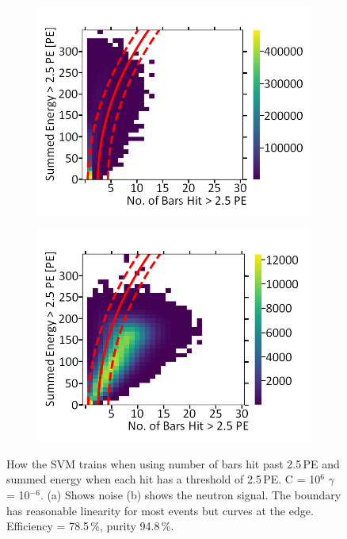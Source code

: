 \begin{figure}[!h]
\centering
\begin{subfigure}{.5\textwidth}
  \centering
  \includegraphics[width=\linewidth]{Appendix1/Figs/Bars1Sum1Noise.png}
  \captionsetup{width=.9\linewidth}
  \caption{}
  \label{subFig:Bars1Sum1N}
\end{subfigure}%
\begin{subfigure}{.5\textwidth}
  \centering
\includegraphics[width=\linewidth]{Appendix1/Figs/Bars1Sum1Signal.png}
  \captionsetup{width=.9\linewidth}
  \caption{}
  \label{subFig:Bars1Sum1S}
\end{subfigure}
\caption[LIBLINEAR SVM Nyström approximated RBF kernel for number of bars hit > 2.5\,PE vs summed energy > 2.5\,PE.]{How the SVM trains when using number of bars hit past 2.5\,PE and summed energy when each hit has a threshold of 2.5\,PE. C = 10$^6$ $\gamma$ = 10$^{-6}$. (a) Shows noise (b) shows the neutron signal. The boundary has reasonable linearity for most events but curves at the edge. Efficiency = 78.5\,\%, purity 94.8\,\%.}
\label{fig:Bars1Sum1SN}
\end{figure}

